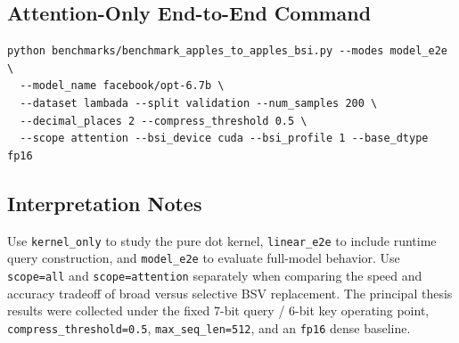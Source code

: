 \subsection{Attention-Only End-to-End Command}
\begin{lstlisting}
python benchmarks/benchmark_apples_to_apples_bsi.py --modes model_e2e \
  --model_name facebook/opt-6.7b \
  --dataset lambada --split validation --num_samples 200 \
  --decimal_places 2 --compress_threshold 0.5 \
  --scope attention --bsi_device cuda --bsi_profile 1 --base_dtype fp16
\end{lstlisting}

\subsection{Interpretation Notes}
Use \texttt{kernel\_only} to study the pure dot kernel, \texttt{linear\_e2e} to include runtime query construction, and \texttt{model\_e2e} to evaluate full-model behavior. Use \texttt{scope=all} and \texttt{scope=attention} separately when comparing the speed and accuracy tradeoff of broad versus selective BSV replacement. The principal thesis results were collected under the fixed 7-bit query / 6-bit key operating point, \texttt{compress\_threshold=0.5}, \texttt{max\_seq\_len=512}, and an \texttt{fp16} dense baseline.
